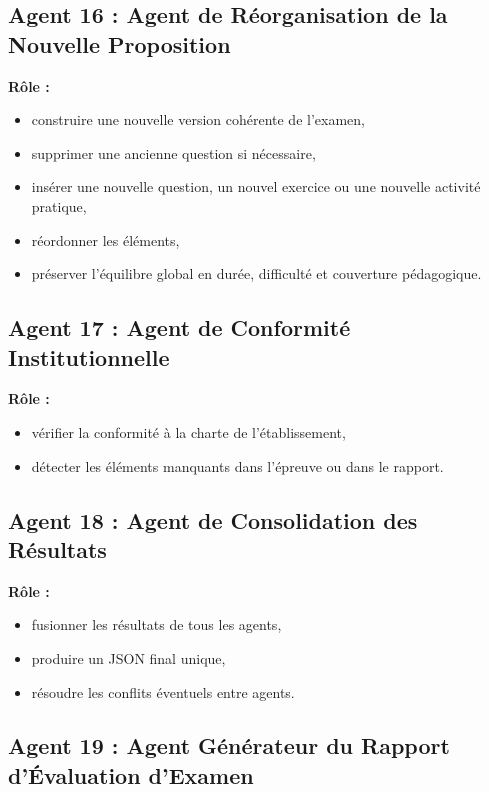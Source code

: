 \documentclass[12pt,a4paper]{article}
\begin{document}
\subsection*{Agent 16 : Agent de Réorganisation de la Nouvelle Proposition}

\textbf{Rôle :}
\begin{itemize}[leftmargin=1cm]
    \item construire une nouvelle version cohérente de l’examen,
    \item supprimer une ancienne question si nécessaire,
    \item insérer une nouvelle question, un nouvel exercice ou une nouvelle activité pratique,
    \item réordonner les éléments,
    \item préserver l’équilibre global en durée, difficulté et couverture pédagogique.
\end{itemize}

\subsection*{Agent 17 : Agent de Conformité Institutionnelle}

\textbf{Rôle :}
\begin{itemize}[leftmargin=1cm]
    \item vérifier la conformité à la charte de l’établissement,
    \item détecter les éléments manquants dans l’épreuve ou dans le rapport.
\end{itemize}

\subsection*{Agent 18 : Agent de Consolidation des Résultats}

\textbf{Rôle :}
\begin{itemize}[leftmargin=1cm]
    \item fusionner les résultats de tous les agents,
    \item produire un JSON final unique,
    \item résoudre les conflits éventuels entre agents.
\end{itemize}

\subsection*{Agent 19 : Agent Générateur du Rapport d’Évaluation d’Examen}
\end{document}
